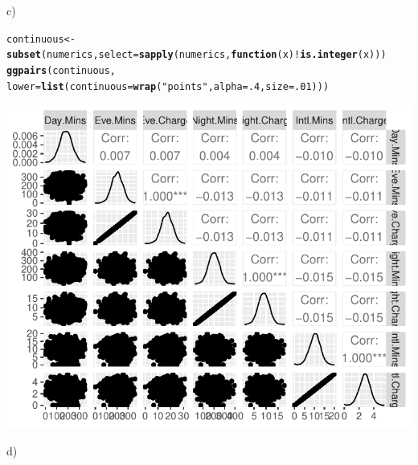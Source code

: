 \documentclass{article}\usepackage[]{graphicx}\usepackage[]{color}
\makeatletter
\def\maxwidth{ %
  \ifdim\Gin@nat@width>\linewidth
    \linewidth
  \else
    \Gin@nat@width
  \fi
}
\newcommand{\hlnum}[1]{\textcolor[rgb]{0.686,0.059,0.569}{#1}}%
\newcommand{\hlstr}[1]{\textcolor[rgb]{0.192,0.494,0.8}{#1}}%
\newcommand{\hlopt}[1]{\textcolor[rgb]{0,0,0}{#1}}%
\newcommand{\hlstd}[1]{\textcolor[rgb]{0.345,0.345,0.345}{#1}}%
\newcommand{\hlkwa}[1]{\textcolor[rgb]{0.161,0.373,0.58}{\textbf{#1}}}%
\newcommand{\hlkwb}[1]{\textcolor[rgb]{0.69,0.353,0.396}{#1}}%
\newcommand{\hlkwc}[1]{\textcolor[rgb]{0.333,0.667,0.333}{#1}}%
\newcommand{\hlkwd}[1]{\textcolor[rgb]{0.737,0.353,0.396}{\textbf{#1}}}%
\newenvironment{kframe}{%
 \def\at@end@of@kframe{}%
 \ifinner\ifhmode%
  \def\at@end@of@kframe{\end{minipage}}%
  \begin{minipage}{\columnwidth}%
 \fi\fi%
 \def\FrameCommand##1{\hskip\@totalleftmargin \hskip-\fboxsep
 \colorbox{shadecolor}{##1}\hskip-\fboxsep
     \hskip-\linewidth \hskip-\@totalleftmargin \hskip\columnwidth}%
 \MakeFramed {\advance\hsize-\width
   \@totalleftmargin\z@ \linewidth\hsize
   \@setminipage}}%
 {\par\unskip\endMakeFramed%
 \at@end@of@kframe}
\newenvironment{knitrout}{}{} %
\makeatother
\begin{document}
\begin{description}
\begin{knitrout}
{}



\end{knitrout}

\item{c)}

\begin{knitrout}
\color{fgcolor}\begin{kframe}
\begin{alltt}
\hlstd{continuous} \hlkwb{<-} \hlkwd{subset}\hlstd{(numerics,} \hlkwc{select}\hlstd{=}\hlkwd{sapply}\hlstd{(numerics,} \hlkwa{function}\hlstd{(}\hlkwc{x}\hlstd{)} \hlopt{!}\hlkwd{is.integer}\hlstd{(x)))}
\hlkwd{ggpairs}\hlstd{(continuous,}
        \hlkwc{lower}\hlstd{=}\hlkwd{list}\hlstd{(}\hlkwc{continuous}\hlstd{=}\hlkwd{wrap}\hlstd{(}\hlstr{"points"}\hlstd{,} \hlkwc{alpha}\hlstd{=}\hlnum{.4}\hlstd{,} \hlkwc{size}\hlstd{=}\hlnum{.01}\hlstd{)))}
\end{alltt}
\end{kframe}

{\centering \includegraphics[width=\maxwidth]{figure/Pair_plot_for_continuous_variables-1} 

}



\end{knitrout}

\item{d)}


\end{description}
\end{document}
